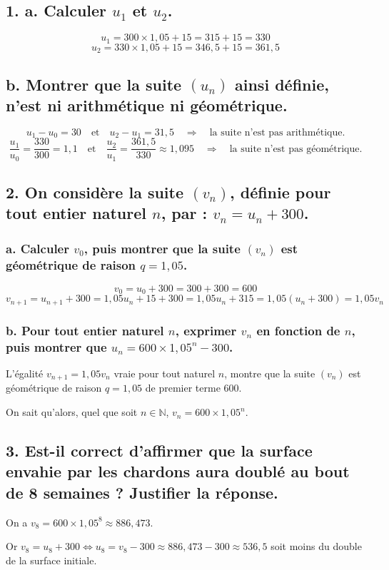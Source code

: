 \subsection*{1. a. Calculer $u_1$ et $u_2$.}
	
	\[
	u_1 = 300 \times 1,05 + 15 = 315 + 15 = 330
	\]
	\[
	u_2 = 330 \times 1,05 + 15 = 346,5 + 15 = 361,5
	\]
	
	\subsection*{b. Montrer que la suite $(u_n)$ ainsi définie, n'est ni arithmétique ni géométrique.}
	
	\[
	u_1 - u_0 = 30 \quad \text{et} \quad u_2 - u_1 = 31,5 \quad \Rightarrow \quad \text{la suite n'est pas arithmétique.}
	\]
	\[
	\dfrac{u_1}{u_0} = \dfrac{330}{300} = 1,1 \quad \text{et} \quad \dfrac{u_2}{u_1} = \dfrac{361,5}{330} \approx 1,095 \quad \Rightarrow \quad \text{la suite n'est pas géométrique.}
	\]
	

	
	\subsection*{2. On considère la suite $(v_n)$, définie pour tout entier naturel $n$, par : $v_n = u_n + 300$.}
	
	\subsubsection*{a. Calculer $v_0$, puis montrer que la suite $(v_n)$ est géométrique de raison $q = 1,05$.}
	
	\[
	v_0 = u_0 + 300 = 300 + 300 = 600
	\]
	\[
	v_{n+1} = u_{n+1} + 300 = 1,05u_n + 15 + 300 = 1,05u_n + 315 = 1,05(u_n + 300) = 1,05v_n
	\]
	
	\subsubsection*{b. Pour tout entier naturel $n$, exprimer $v_n$ en fonction de $n$, puis montrer que $u_n = 600 \times 1,05^n - 300$.}
	
	L'égalité $v_{n+1} = 1,05v_n$ vraie pour tout naturel $n$, montre que la suite $(v_n)$ est géométrique de raison $q = 1,05$ de premier terme 600.
	
	On sait qu'alors, quel que soit $n \in \mathbb{N}$, $v_n = 600 \times 1,05^n$.
	
	\subsection*{3. Est-il correct d'affirmer que la surface envahie par les chardons aura doublé au bout de 8 semaines ? Justifier la réponse.}
	
	On a $v_8 = 600 \times 1,05^8 \approx 886,473$.
	
	Or $v_8 = u_8 + 300 \iff u_8 = v_8 - 300 \approx 886,473 - 300 \approx 536,5$ soit moins du double de la surface initiale.
